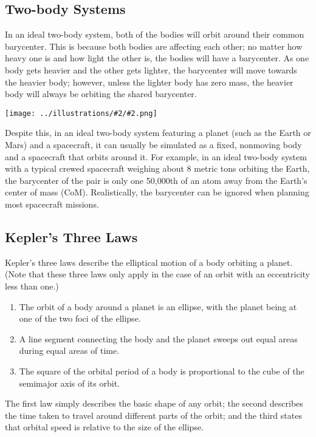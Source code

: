 \documentclass[oneside,a5paper]{book}
\newcommand{\widthillustration}[2]{{\centering\texttt{[image: ../illustrations/\#2/\#2.png]}}}
\newcommand{\illustration}[1]{\widthillustration{\linewidth}{#1}}
\begin{document}
\subsection{Two-body Systems}

In an ideal two-body system, both of the bodies will orbit around
their common barycenter. This is because both bodies are affecting
each other; no matter how heavy one is and how light the other is, the
bodies will have a barycenter. As one body gets heavier and the other
gets lighter, the barycenter will move towards the heavier body;
however, unless the lighter body has zero mass, the heavier body will
always be orbiting the shared barycenter.

\illustration{barycenter}

Despite this, in an ideal two-body system featuring a planet (such as
the Earth or Mars) and a spacecraft, it can usually be simulated as a
fixed, nonmoving body and a spacecraft that orbits around it. For
example, in an ideal two-body system with a typical crewed spacecraft
weighing about 8 metric tons orbiting the Earth, the barycenter of the
pair is only one 50,000th of an atom away from the Earth’s center of
mass (CoM). Realistically, the barycenter can be ignored when planning
most spacecraft missions.

\subsection{Kepler's Three Laws}

Kepler’s three laws describe the elliptical motion of a body orbiting
a planet. (Note that these three laws only apply in the case of an
orbit with an eccentricity less than one.)

\begin{enumerate}
\item The orbit of a body around a planet is an ellipse, with the planet
  being at one of the two foci of the ellipse.
\item A line segment connecting the body and the planet sweeps out equal
  areas during equal areas of time.
\item The square of the orbital period of a body is proportional to the
  cube of the semimajor axis of its orbit.
\end{enumerate}

The first law simply describes the basic shape of any orbit; the
second describes the time taken to travel around different parts of
the orbit; and the third states that orbital speed is relative to the
size of the ellipse.
\end{document}
